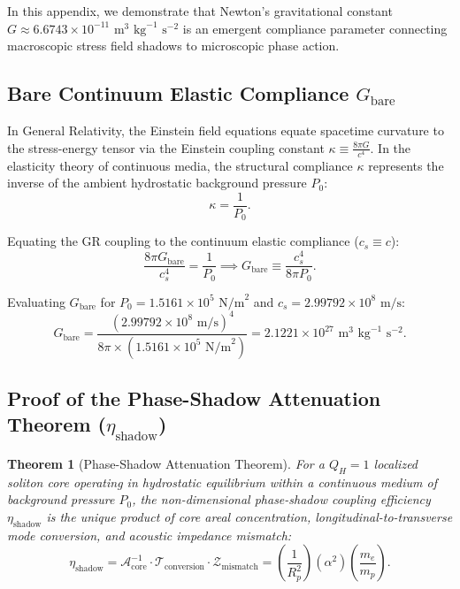 \documentclass[11pt,a4paper]{article}
\newtheorem{thm}{Theorem}
\begin{document}
	In this appendix, we demonstrate that Newton's gravitational constant $G \approx 6.6743 \times 10^{-11} \text{ m}^3\text{ kg}^{-1}\text{ s}^{-2}$ is an emergent compliance parameter connecting macroscopic stress field shadows to microscopic phase action.
	
	\subsection{Bare Continuum Elastic Compliance $G_{\text{bare}}$}
	In General Relativity, the Einstein field equations equate spacetime curvature to the stress-energy tensor via the Einstein coupling constant $\kappa \equiv \frac{8\pi G}{c^4}$. In the elasticity theory of continuous media, the structural compliance $\kappa$ represents the inverse of the ambient hydrostatic background pressure $P_0$:
	\begin{equation}
		\kappa = \frac{1}{P_0}.
		\label{eq:kappa_P0_identity}
	\end{equation}
	
	Equating the GR coupling to the continuum elastic compliance ($c_s \equiv c$):
	\begin{equation}
		\frac{8\pi G_{\text{bare}}}{c_s^4} = \frac{1}{P_0} \implies G_{\text{bare}} \equiv \frac{c_s^4}{8\pi P_0}.
		\label{eq:G_bare_derivation}
	\end{equation}
	
	Evaluating $G_{\text{bare}}$ for $P_0 = 1.5161 \times 10^5 \text{ N/m}^2$ and $c_s = 2.99792 \times 10^8 \text{ m/s}$:
	\begin{equation}
		G_{\text{bare}} = \frac{(2.99792 \times 10^8 \text{ m/s})^4}{8\pi \times (1.5161 \times 10^5 \text{ N/m}^2)} = 2.1221 \times 10^{27} \text{ m}^3\text{ kg}^{-1}\text{ s}^{-2}.
		\label{eq:G_bare_numerical}
	\end{equation}
	
	\subsection{Proof of the Phase-Shadow Attenuation Theorem (\texorpdfstring{$\eta_{\text{shadow}}$}{eta_shadow})}
	\label{app:eta_shadow_proof}
	
	\begin{thm}[Phase-Shadow Attenuation Theorem]
		\label{thm:eta_shadow}
		For a $Q_H = 1$ localized soliton core operating in hydrostatic equilibrium within a continuous medium of background pressure $P_0$, the non-dimensional phase-shadow coupling efficiency $\eta_{\text{shadow}}$ is the unique product of core areal concentration, longitudinal-to-transverse mode conversion, and acoustic impedance mismatch:
		\begin{equation}
			\eta_{\text{shadow}} = \mathcal{A}_{\text{core}}^{-1} \cdot \mathcal{T}_{\text{conversion}} \cdot \mathcal{Z}_{\text{mismatch}} = \left( \frac{1}{R_p^2} \right) \left( \alpha^2 \right) \left( \frac{m_e}{m_p} \right).
			\label{eq:eta_shadow_theorem_eq}
		\end{equation}
	\end{thm}
	
\end{document}
